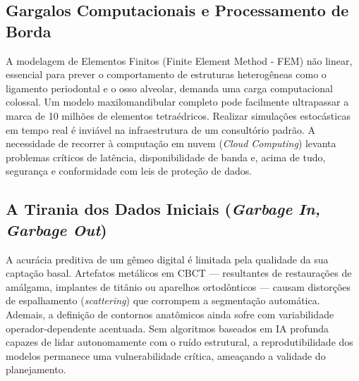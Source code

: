\subsection{Gargalos Computacionais e Processamento de Borda}

A modelagem de Elementos Finitos (Finite Element Method - FEM) não linear, essencial para prever o comportamento de estruturas heterogêneas como o ligamento periodontal e o osso alveolar, demanda uma carga computacional colossal. Um modelo maxilomandibular completo pode facilmente ultrapassar a marca de 10 milhões de elementos tetraédricos. Realizar simulações estocásticas em tempo real é inviável na infraestrutura de um consultório padrão. A necessidade de recorrer à computação em nuvem (\textit{Cloud Computing}) levanta problemas críticos de latência, disponibilidade de banda e, acima de tudo, segurança e conformidade com leis de proteção de dados.

\subsection{A Tirania dos Dados Iniciais (\textit{Garbage In, Garbage Out})}

A acurácia preditiva de um gêmeo digital é limitada pela qualidade da sua captação basal. Artefatos metálicos em CBCT — resultantes de restaurações de amálgama, implantes de titânio ou aparelhos ortodônticos — causam distorções de espalhamento (\textit{scattering}) que corrompem a segmentação automática. Ademais, a definição de contornos anatômicos ainda sofre com variabilidade operador-dependente acentuada. Sem algoritmos baseados em IA profunda capazes de lidar autonomamente com o ruído estrutural, a reprodutibilidade dos modelos permanece uma vulnerabilidade crítica, ameaçando a validade do planejamento.
